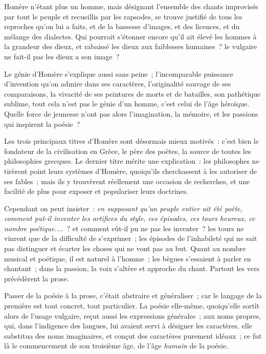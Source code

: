 \documentclass[french,twoside]{book} %
\begin{document}
Homère n’étant plus un homme, mais désignant l’ensemble des chants improvisés par tout le peuple et recueillis par les rapsodes, se trouve justifié de tous les reproches qu’on lui a faits, et de la bassesse d’images, et des licences, et du mélange des dialectes.  Qui pourrait s’étonner encore qu’il ait élevé les hommes à la grandeur des dieux, et rabaissé les dieux aux faiblesses humaines ? le vulgaire ne fait-il pas les dieux a son image ?\par
Le génie d’Homère s’explique aussi sans peine ; l’incomparable puissance d’invention qu’on admire dans ses caractères, l’originalité sauvage de ses comparaisons, la vivacité de ses peintures de morts et de batailles, son pathétique sublime, tout cela n’est pas le génie d’un homme, c’est celui de l’âge héroïque. Quelle force de jeunesse n’ont pas alors l’imagination, la mémoire, et les passions qui inspirent la poésie ?\par
Les trois principaux titres d’Homère sont désormais mieux motivés : c’est bien le fondateur de la civilisation en Grèce, le père des poètes, la source de toutes les philosophies grecques. Le dernier titre mérite une explication : les philosophes ne tirèrent point leurs systèmes d’Homère, quoiqu’ils cherchassent à les autoriser de ses fables ; mais ils y trouvèrent réellement une occasion de recherches, et une facilité de plus pour exposer et populariser leurs doctrines.\par
Cependant on peut insister : {\itshape en supposant qu’un peuple entier ait été poète, comment put-il inventer les artifices du style, ces épisodes, ces tours heureux, ce nombre poétique....} ? et comment eût-il pu  ne pas les inventer ? les tours ne vinrent que de la difficulté de s’exprimer ; les épisodes de l’inhabileté qui ne sait pas distinguer et écarter les choses qui ne vont pas au but. Quant au nombre musical et poétique, il est naturel à l’homme ; les bègues s’essaient à parler en chantant ; dans la passion, la voix s’altère et approche du chant. Partout les vers précédèrent la prose.\par
Passer de la poésie à la prose, c’était abstraire et généraliser ; car le langage de la première est tout concret, tout particulier. La poésie elle-même, quoiqu’elle sortît alors de l’usage vulgaire, reçut aussi les expressions générales ; aux noms propres, qui, dans l’indigence des langues, lui avaient servi à désigner les caractères, elle substitua des noms imaginaires, et conçut des caractères purement idéaux ; ce fut là le commencement de son troisième âge, de l’âge {\itshape humain} de la poésie.\par
\end{document}
